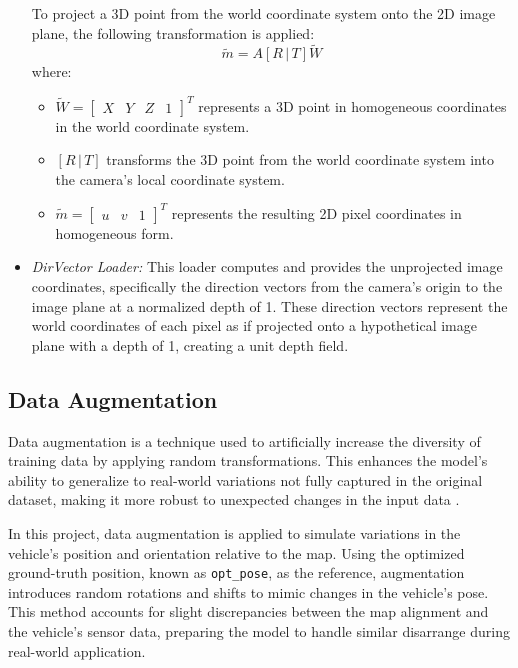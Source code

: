 \begin{itemize}
    To project a 3D point from the world coordinate system onto the 2D image plane, the following transformation is applied:
    \begin{equation}
        \tilde{m} = A [R \,|\, T] \tilde{W}
    \end{equation}
    where:
    \begin{itemize}
        \item \( \tilde{W} = \begin{bmatrix} X & Y & Z & 1 \end{bmatrix}^T \) represents a 3D point in homogeneous coordinates in the world coordinate system.
        \item \( [R \,|\, T] \) transforms the 3D point from the world coordinate system into the camera's local coordinate system.
        \item \( \tilde{m} = \begin{bmatrix} u & v & 1 \end{bmatrix}^T \) represents the resulting 2D pixel coordinates in homogeneous form.
    \end{itemize}

    \item \textit{DirVector Loader:} This loader computes and provides the unprojected image coordinates, specifically the direction vectors from the camera's origin to the image plane at a normalized depth of 1. These direction vectors represent the world coordinates of each pixel as if projected onto a hypothetical image plane with a depth of 1, creating a unit depth field.
    
\end{itemize}

\subsection{Data Augmentation} 

Data augmentation is a technique used to artificially increase the diversity of training data by applying random transformations. This enhances the model’s ability to generalize to real-world variations not fully captured in the original dataset, making it more robust to unexpected changes in the input data \cite{MUMUNI2022100258}.

In this project, data augmentation is applied to simulate variations in the vehicle's position and orientation relative to the map. Using the optimized ground-truth position, known as \texttt{opt\_pose}, as the reference, augmentation introduces random rotations and shifts to mimic changes in the vehicle’s pose. This method accounts for slight discrepancies between the map alignment and the vehicle’s sensor data, preparing the model to handle similar disarrange during real-world application.

